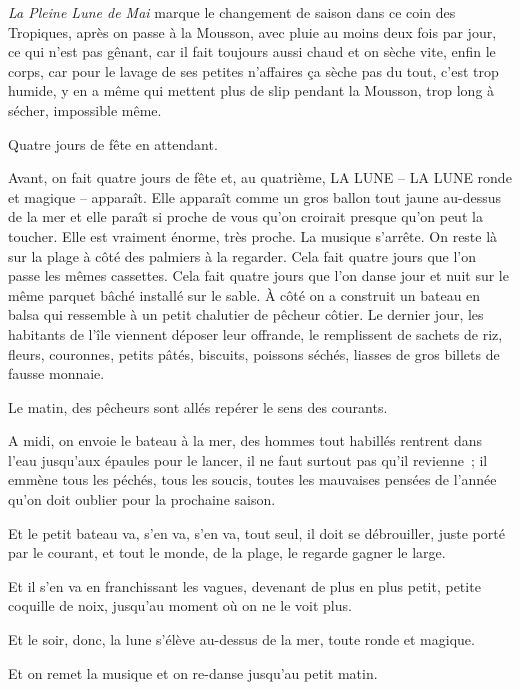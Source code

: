 \documentclass[french,twoside]{book} %
\begin{document}
\noindent \emph{La Pleine Lune de Mai} marque le changement de saison dans ce coin des Tropiques, après on passe à la Mousson, avec pluie au moins deux fois par jour, ce qui n’est pas gênant, car il fait toujours aussi chaud et on sèche vite, enfin le corps, car pour le lavage de ses petites n’affaires ça sèche pas du tout, c’est trop humide, y en a même qui mettent plus de slip pendant la Mousson, trop long à sécher, impossible même.\par
Quatre jours de fête en attendant.\par
Avant, on fait quatre jours de fête et, au quatrième, LA LUNE – LA LUNE ronde et magique – apparaît. Elle apparaît comme un gros ballon tout jaune au-dessus de la mer et elle paraît si proche de vous qu’on croirait presque qu’on peut la toucher. Elle est vraiment énorme, très proche. La musique s’arrête. On reste là sur la plage à côté des palmiers à la regarder. Cela fait quatre jours que l’on passe les mêmes cassettes. Cela fait quatre jours que l’on danse jour et nuit sur le même parquet bâché installé sur le sable. À côté on a construit un bateau en balsa qui ressemble à un petit chalutier de pêcheur côtier. Le dernier jour, les habitants de l’île viennent déposer leur offrande, le remplissent de sachets de riz, fleurs, couronnes, petits pâtés, biscuits, poissons séchés, liasses de gros billets de fausse monnaie.\par
Le matin, des pêcheurs sont allés repérer le sens des courants.\par
A midi, on envoie le bateau à la mer, des hommes tout habillés rentrent dans l’eau jusqu’aux épaules pour le lancer, il ne faut surtout pas qu’il revienne ; il emmène tous les péchés, tous les soucis, toutes les mauvaises pensées de l’année qu’on doit oublier pour la prochaine saison.\par
Et le petit bateau va, s’en va, s’en va, tout seul, il doit se débrouiller, juste porté par le courant, et tout le monde, de la plage, le regarde gagner le large.\par
Et il s’en va en franchissant les vagues, devenant de plus en plus petit, petite coquille de noix, jusqu’au moment où on ne le voit plus.\par
Et le soir, donc, la lune s’élève au-dessus de la mer, toute ronde et magique.\par
Et on remet la musique et on re-danse jusqu’au petit matin.\par
\bigbreak
\end{document}
